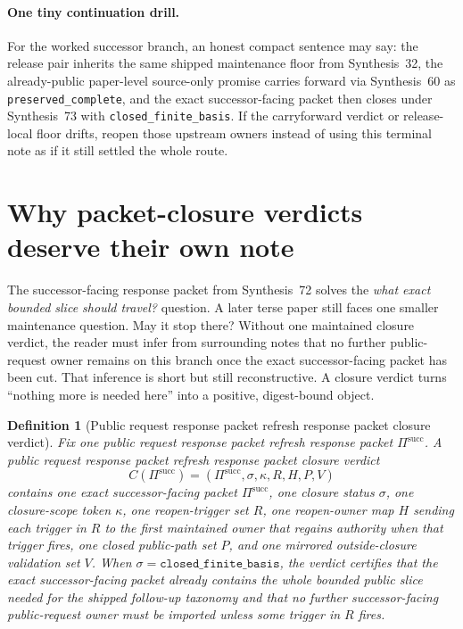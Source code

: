 \documentclass[11pt]{article}
\newtheorem{definition}{Definition}
\begin{document}
\paragraph{One tiny continuation drill.}
For the worked successor branch, an honest compact sentence may say: the release pair inherits the same shipped maintenance floor from Synthesis~32, the already-public paper-level source-only promise carries forward via Synthesis~60 as \texttt{preserved\_complete}, and the exact successor-facing packet then closes under Synthesis~73 with \texttt{closed\_finite\_basis}. If the carryforward verdict or release-local floor drifts, reopen those upstream owners instead of using this terminal note as if it still settled the whole route.\cite{series:releasespine,series:publicrequestcarryforward,series:workedexample}

\section{Why packet-closure verdicts deserve their own note}
The successor-facing response packet from Synthesis~72 solves the \emph{what exact bounded slice should travel?} question.
A later terse paper still faces one smaller maintenance question.
May it stop there?
Without one maintained closure verdict, the reader must infer from surrounding notes that no further public-request owner remains on this branch once the exact successor-facing packet has been cut.
That inference is short but still reconstructive.
A closure verdict turns ``nothing more is needed here'' into a positive, digest-bound object.

\begin{definition}[Public request response packet refresh response packet closure verdict]
Fix one public request response packet refresh response packet $\Pi^{\mathrm{succ}}$.
A \emph{public request response packet refresh response packet closure verdict}
\[
C(\Pi^{\mathrm{succ}})=(\Pi^{\mathrm{succ}},\sigma,\kappa,R,H,P,V)
\]
contains one exact successor-facing packet $\Pi^{\mathrm{succ}}$, one closure status $\sigma$, one closure-scope token $\kappa$, one reopen-trigger set $R$, one reopen-owner map $H$ sending each trigger in $R$ to the first maintained owner that regains authority when that trigger fires, one closed public-path set $P$, and one mirrored outside-closure validation set $V$.
When $\sigma=\texttt{closed\_finite\_basis}$, the verdict certifies that the exact successor-facing packet already contains the whole bounded public slice needed for the shipped follow-up taxonomy and that no further successor-facing public-request owner must be imported unless some trigger in $R$ fires.
\end{definition}
\end{document}

